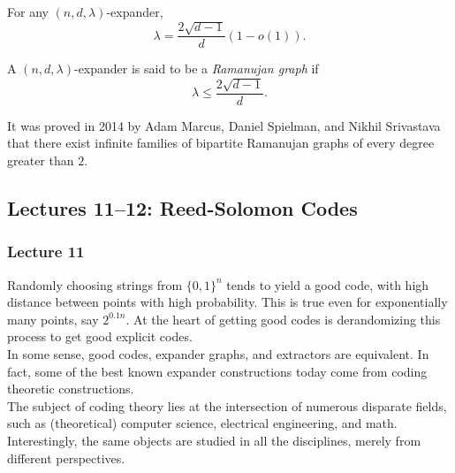 			\begin{ftheo}
				For any $(n,d,\lambda)$-expander,
				\[ \lambda = \frac{2\sqrt{d-1}}{d}(1 - o(1)). \]
			\end{ftheo}

			\begin{fdef}
				A $(n,d,\lambda)$-expander is said to be a \emph{Ramanujan graph} if
				\[ \lambda \le \frac{2\sqrt{d-1}}{d}. \]
			\end{fdef}

			It was proved in 2014 by Adam Marcus, Daniel Spielman, and Nikhil Srivastava that there exist infinite families of bipartite Ramanujan graphs of every degree greater than $2$.

	\subsection{Lectures 11--12: Reed-Solomon Codes}

		\subsubsection{Lecture 11}

			Randomly choosing strings from $\{0,1\}^n$ tends to yield a good code, with high distance between points with high probability. This is true even for exponentially many points, say $2^{0.1n}$. At the heart of getting good codes is derandomizing this process to get good explicit codes.\\
			In some sense, good codes, expander graphs, and extractors are equivalent. In fact, some of the best known expander constructions today come from coding theoretic constructions.\\
			The subject of coding theory lies at the intersection of numerous disparate fields, such as (theoretical) computer science, electrical engineering, and math. Interestingly, the same objects are studied in all the disciplines, merely from different perspectives.\\

